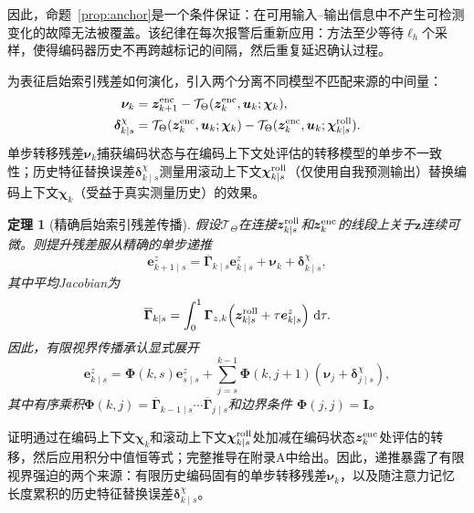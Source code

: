 \documentclass[journal]{IEEEtran}
\newtheorem{theorem}{定理}
\newcommand{\1}{\bm 1}
\begin{document}
因此，命题~\ref{prop:anchor}是一个条件保证：在可用输入--输出信息中不产生可检测变化的故障无法被覆盖。该纪律在每次报警后重新应用：方法至少等待$\ell_h$个采样，使得编码器历史不再跨越标记的间隔，然后重复延迟确认过程。

为表征启始索引残差如何演化，引入两个分离不同模型不匹配来源的中间量：
\begin{equation}
\begin{aligned}
\bm\nu_k
&=\bm z_{k+1}^{\rm enc}
-\mathcal T_\Theta(\bm z_k^{\rm enc},\bm u_k;\bm\chi_k),\\
\bm\delta_{k\mid s}^{\chi}
&=\mathcal T_\Theta(\bm z_k^{\rm enc},\bm u_k;\bm\chi_k)
-\mathcal T_\Theta(\bm z_k^{\rm enc},\bm u_k;
\bm\chi_{k\mid s}^{\rm roll}).
\end{aligned}
\label{eq:innovation_context}
\end{equation}
单步转移残差$\bm\nu_k$捕获编码状态与在编码上下文处评估的转移模型的单步不一致性；历史特征替换误差$\bm\delta_{k\mid s}^{\chi}$测量用滚动上下文$\bm\chi_{k\mid s}^{\rm roll}$（仅使用自我预测输出）替换编码上下文$\bm\chi_k$（受益于真实测量历史）的效果。

\begin{theorem}[精确启始索引残差传播]
\label{thm:exact}
假设$\mathcal T_\Theta$在连接$\bm z_{k\mid s}^{\rm roll}$和$\bm z_k^{\rm enc}$的线段上关于$\bm z$连续可微。则提升残差服从精确的单步递推
\begin{equation}
\bm e_{k+1\mid s}^z
=\overline{\bm\Gamma}_{k\mid s}\bm e_{k\mid s}^z
+\bm\nu_k+\bm\delta_{k\mid s}^{\chi},
\label{eq:exact_recursion}
\end{equation}
其中平均Jacobian为
\begin{equation}
\overline{\bm\Gamma}_{k\mid s}=
\int_0^1
\bm\Gamma_{z,k}\!\left(
\bm z_{k\mid s}^{\rm roll}
+\tau\bm e_{k\mid s}^z\right)\,\mathrm d\tau.
\label{eq:averaged_jacobian}
\end{equation}
因此，有限视界传播承认显式展开
\begin{equation}
\bm e_{k\mid s}^z=
\bm\Phi(k,s)\bm e_{s\mid s}^z+
\sum_{j=s}^{k-1}\bm\Phi(k,j+1)
(\bm\nu_j+\bm\delta_{j\mid s}^{\chi}),
\label{eq:finite_propagation}
\end{equation}
其中有序乘积$\bm\Phi(k,j)=
\overline{\bm\Gamma}_{k-1\mid s}\cdots
\overline{\bm\Gamma}_{j\mid s}$和边界条件
$\bm\Phi(j,j)=\bm I$。
\end{theorem}

证明通过在编码上下文$\bm\chi_k$和滚动上下文$\bm\chi_{k\mid s}^{\rm roll}$处加减在编码状态$\bm z_k^{\rm enc}$处评估的转移，然后应用积分中值恒等式；完整推导在附录A中给出。因此，递推暴露了有限视界强迫的两个来源：有限历史编码固有的单步转移残差$\bm\nu_k$，以及随注意力记忆长度累积的历史特征替换误差$\bm\delta_{k\mid s}^{\chi}$。
\end{document}
